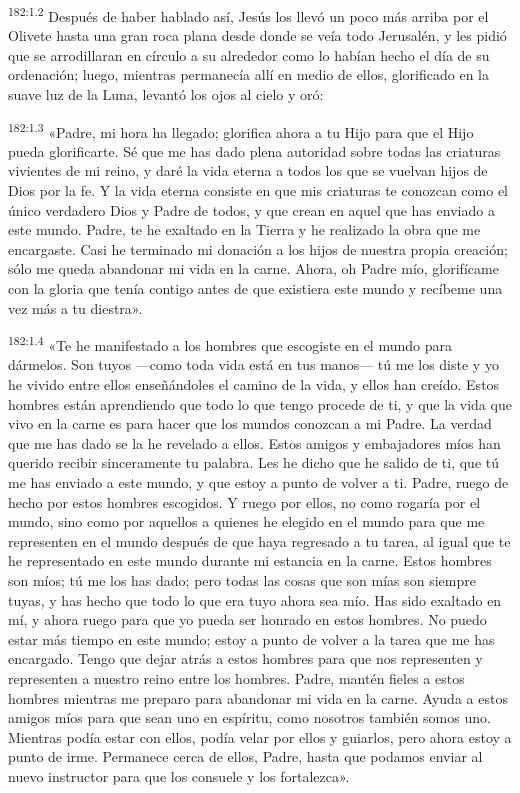 \par 
\textsuperscript{182:1.2} Después de haber hablado así, Jesús los llevó un poco más arriba por el Olivete hasta una gran roca plana desde donde se veía todo Jerusalén, y les pidió que se arrodillaran en círculo a su alrededor como lo habían hecho el día de su ordenación; luego, mientras permanecía allí en medio de ellos, glorificado en la suave luz de la Luna, levantó los ojos al cielo y oró:

\par 
\textsuperscript{182:1.3} «Padre, mi hora ha llegado; glorifica ahora a tu Hijo para que el Hijo pueda glorificarte. Sé que me has dado plena autoridad sobre todas las criaturas vivientes de mi reino, y daré la vida eterna a todos los que se vuelvan hijos de Dios por la fe. Y la vida eterna consiste en que mis criaturas te conozcan como el único verdadero Dios y Padre de todos, y que crean en aquel que has enviado a este mundo. Padre, te he exaltado en la Tierra y he realizado la obra que me encargaste. Casi he terminado mi donación a los hijos de nuestra propia creación; sólo me queda abandonar mi vida en la carne. Ahora, oh Padre mío, glorifícame con la gloria que tenía contigo antes de que existiera este mundo y recíbeme una vez más a tu diestra».

\par 
\textsuperscript{182:1.4} «Te he manifestado a los hombres que escogiste en el mundo para dármelos. Son tuyos ---como toda vida está en tus manos--- tú me los diste y yo he vivido entre ellos enseñándoles el camino de la vida, y ellos han creído. Estos hombres están aprendiendo que todo lo que tengo procede de ti, y que la vida que vivo en la carne es para hacer que los mundos conozcan a mi Padre. La verdad que me has dado se la he revelado a ellos. Estos amigos y embajadores míos han querido recibir sinceramente tu palabra. Les he dicho que he salido de ti, que tú me has enviado a este mundo, y que estoy a punto de volver a ti. Padre, ruego de hecho por estos hombres escogidos. Y ruego por ellos, no como rogaría por el mundo, sino como por aquellos a quienes he elegido en el mundo para que me representen en el mundo después de que haya regresado a tu tarea, al igual que te he representado en este mundo durante mi estancia en la carne. Estos hombres son míos; tú me los has dado; pero todas las cosas que son mías son siempre tuyas, y has hecho que todo lo que era tuyo ahora sea mío. Has sido exaltado en mí, y ahora ruego para que yo pueda ser honrado en estos hombres. No puedo estar más tiempo en este mundo; estoy a punto de volver a la tarea que me has encargado. Tengo que dejar atrás a estos hombres para que nos representen y representen a nuestro reino entre los hombres. Padre, mantén fieles a estos hombres mientras me preparo para abandonar mi vida en la carne. Ayuda a estos amigos míos para que sean uno en espíritu, como nosotros también somos uno. Mientras podía estar con ellos, podía velar por ellos y guiarlos, pero ahora estoy a punto de irme. Permanece cerca de ellos, Padre, hasta que podamos enviar al nuevo instructor para que los consuele y los fortalezca».


